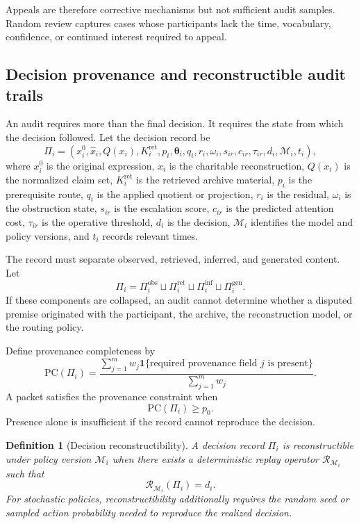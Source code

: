 \documentclass[11pt]{article}
\newtheorem{definition}{Definition}[section]
\theoremstyle{definition}
\newcommand{\thetaState}{\boldsymbol{\theta}}
\newcommand{\ind}{\mathbf{1}}
\begin{document}
Appeals are therefore corrective mechanisms but not sufficient audit samples. Random review captures cases whose participants lack the time, vocabulary, confidence, or continued interest required to appeal.

\subsection{Decision provenance and reconstructible audit trails}

An audit requires more than the final decision. It requires the state from which the decision followed. Let the decision record be
\[
\Pi_i
=
\left(
x_i^{0},
\widehat{x}_i,
Q(x_i),
K_i^{\mathrm{ret}},
p_i,
\thetaState_i,
q_i,
r_i,
\omega_i,
s_{ir},
c_{ir},
\tau_{ir},
d_i,
\mathcal{M}_i,
t_i
\right),
\]
where \(x_i^{0}\) is the original expression, \(\widehat{x}_i\) is the charitable reconstruction, \(Q(x_i)\) is the normalized claim set, \(K_i^{\mathrm{ret}}\) is the retrieved archive material, \(p_i\) is the prerequisite route, \(q_i\) is the applied quotient or projection, \(r_i\) is the residual, \(\omega_i\) is the obstruction state, \(s_{ir}\) is the escalation score, \(c_{ir}\) is the predicted attention cost, \(\tau_{ir}\) is the operative threshold, \(d_i\) is the decision, \(\mathcal{M}_i\) identifies the model and policy versions, and \(t_i\) records relevant times.

The record must separate observed, retrieved, inferred, and generated content. Let
\[
\Pi_i
=
\Pi_i^{\mathrm{obs}}
\sqcup
\Pi_i^{\mathrm{ret}}
\sqcup
\Pi_i^{\mathrm{inf}}
\sqcup
\Pi_i^{\mathrm{gen}}.
\]
If these components are collapsed, an audit cannot determine whether a disputed premise originated with the participant, the archive, the reconstruction model, or the routing policy.

Define provenance completeness by
\[
\mathrm{PC}(\Pi_i)
=
\frac{
\sum_{j=1}^{m}w_j
\ind\{\text{required provenance field }j\text{ is present}\}
}{
\sum_{j=1}^{m}w_j
}.
\]
A packet satisfies the provenance constraint when
\[
\mathrm{PC}(\Pi_i)\geq p_0.
\]
Presence alone is insufficient if the record cannot reproduce the decision.

\begin{definition}[Decision reconstructibility]
A decision record \(\Pi_i\) is reconstructible under policy version \(\mathcal{M}_i\) when there exists a deterministic replay operator \(\mathcal{R}_{\mathcal{M}_i}\) such that
\[
\mathcal{R}_{\mathcal{M}_i}(\Pi_i)=d_i.
\]
For stochastic policies, reconstructibility additionally requires the random seed or sampled action probability needed to reproduce the realized decision.
\end{definition}
\end{document}
